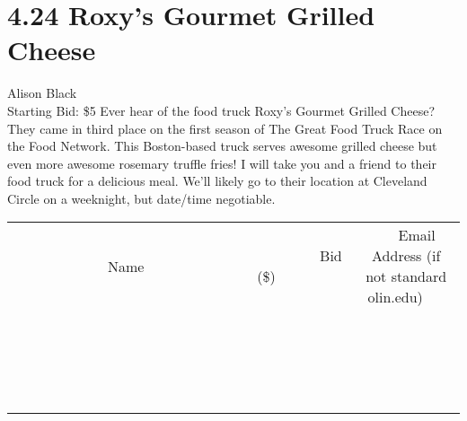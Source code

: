 \documentclass[11pt]{article}
\begin{document}
\section*{4.24 Roxy's Gourmet Grilled Cheese}
Alison Black
\\
Starting Bid: \$5
\newline
Ever hear of the food truck Roxy's Gourmet Grilled Cheese?  They came in third place on the first season of The Great Food Truck Race on the Food Network.  This Boston-based truck serves awesome grilled cheese but even more awesome rosemary truffle fries!  I will take you and a friend to their food truck for a delicious meal.  We'll likely go to their location at Cleveland Circle on a weeknight, but date/time negotiable.
\\[3ex]
\begin{tabular}{c c c}
~~~~~~~~~~~~~Name~~~~~~~~~~~~~ & ~~~~~~~~~Bid (\$)~~~~~~~~~  & ~~~Email Address (if not standard olin.edu)~~~\\
 & & \\
\hline
 & & \\
\hline
 & & \\
\hline
 & & \\
\hline
 & & \\
\hline
 & & \\
\hline
 & & \\
\hline
 & & \\
\hline
 & & \\
\hline
 & & \\
\hline
 & & \\
\hline
 & & \\
\hline
 & & \\
\hline
 & & \\
\hline
 & & \\
\hline
 & & \\
\hline
 & & \\
\hline
 & & \\
\hline
 & & \\
\hline
\end{tabular}
\newpage
\end{document}
